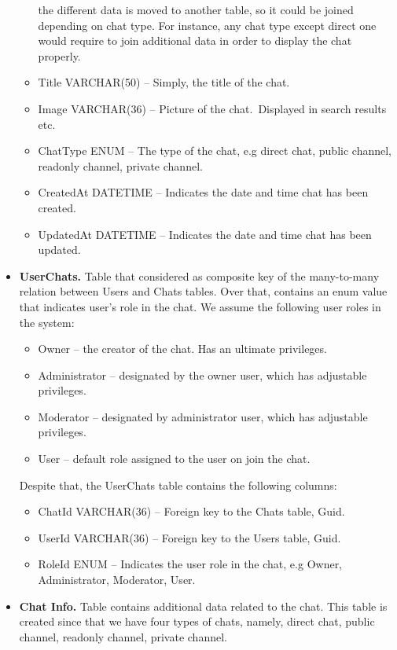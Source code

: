 \begin{itemize}
\begin{itemize}
        the different data is moved to another table, so it could be joined depending on chat type.
        For instance, any chat type except direct one would require to join additional data in order to display the chat properly.
        \item Title VARCHAR(50) -- Simply, the title of the chat.
        \item Image VARCHAR(36) -- Picture of the chat.\ Displayed in search results etc.
        \item ChatType ENUM -- The type of the chat, e.g direct chat, public channel, readonly channel, private channel.
        \item CreatedAt DATETIME -- Indicates the date and time chat has been created.
        \item UpdatedAt DATETIME -- Indicates the date and time chat has been updated.
    \end{itemize}
    \item \textbf{UserChats.} Table that considered as composite key of the many-to-many relation between Users and Chats tables.
    Over that, contains an enum value that indicates user's role in the chat.
    We assume the following user roles in the system:
    \begin{itemize}
        \item Owner -- the creator of the chat.
        Has an ultimate privileges.
        \item Administrator -- designated by the owner user, which has adjustable privileges.
        \item Moderator -- designated by administrator user, which has adjustable privileges.
        \item User -- default role assigned to the user on join the chat.
    \end{itemize}
    Despite that, the UserChats table contains the following columns:
    \begin{itemize}
        \item ChatId VARCHAR(36) -- Foreign key to the Chats table, Guid.
        \item UserId VARCHAR(36) -- Foreign key to the Users table, Guid.
        \item RoleId ENUM -- Indicates the user role in the chat, e.g Owner, Administrator, Moderator, User.
    \end{itemize}
    \item \textbf{Chat Info.} Table contains additional data related to the chat.
    This table is created since that we have four types of chats, namely, direct chat, public channel, readonly channel, private channel.

\end{itemize}
